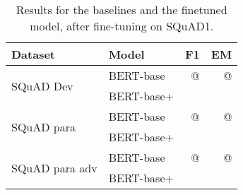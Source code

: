 \begin{table}[t]
    \centering
\begin{tabular}{llrr}
\toprule
Dataset & Model &       F1 & EM \\
\midrule

\multirow{2}{*}{SQuAD Dev} & BERT-base & @ & @ \\
& BERT-base+ & & \\ \midrule

\multirow{2}{*}{SQuAD para} & BERT-base & @ & @ \\
& BERT-base+ & & \\ \midrule

\multirow{2}{*}{SQuAD para adv} & BERT-base & @ & @ \\
& BERT-base+ & & \\
\bottomrule
\end{tabular}

    \caption{Results for the baselines and the finetuned model, after fine-tuning on SQuAD1.}
    \label{tab:squad-ft}
\end{table}